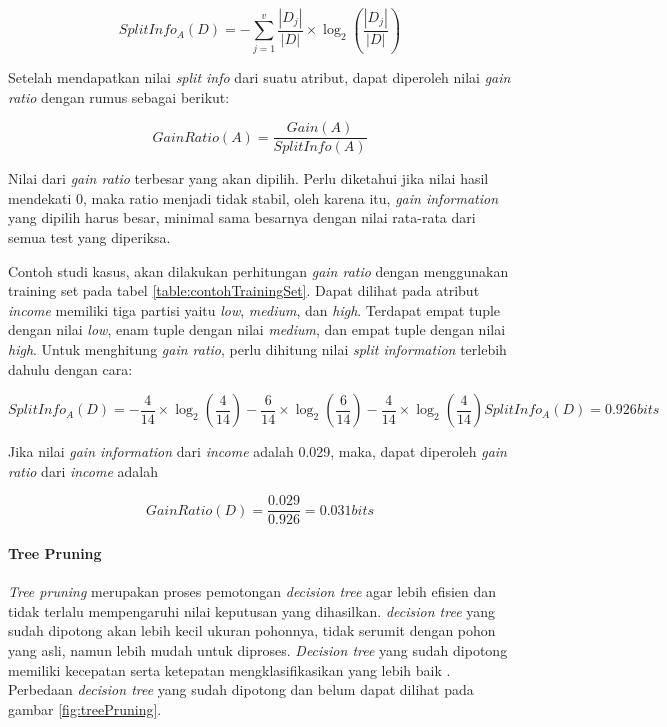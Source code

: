 \begin{displaymath}
	SplitInfo_A(D) = - \sum_{j=1}^v \frac{|D_j|}{|D|} \times \log_2 (\frac{|D_j|}{|D|})
\end{displaymath}

Setelah mendapatkan nilai \textsl{split info} dari suatu atribut, dapat diperoleh nilai \textsl{gain ratio} dengan rumus sebagai berikut:

\begin{displaymath}
	GainRatio(A) = \frac{Gain(A)}{SplitInfo(A)}
\end{displaymath}

Nilai dari \textsl{gain ratio} terbesar yang akan dipilih. Perlu diketahui \cite{DM} jika nilai hasil mendekati 0, maka ratio menjadi tidak stabil, oleh karena itu, \textsl{gain information} yang dipilih harus besar, minimal sama besarnya dengan nilai rata-rata dari semua test yang diperiksa.

Contoh studi kasus, akan dilakukan perhitungan \textsl{gain ratio} dengan menggunakan training set pada tabel \ref{table:contohTrainingSet}. Dapat dilihat pada atribut \textsl{income} memiliki tiga partisi yaitu \textsl{low}, \textsl{medium}, dan \textsl{high}. Terdapat empat tuple dengan nilai \textsl{low}, enam tuple dengan nilai \textsl{medium}, dan empat tuple dengan nilai \textsl{high}. Untuk menghitung \textsl{gain ratio}, perlu dihitung nilai \textsl{split information} terlebih dahulu dengan cara:

\begin{displaymath}
	SplitInfo_A(D) = - \frac{4}{14} \times \log_2 (\frac{4}{14}) - \frac{6}{14} \times \log_2 (\frac{6}{14}) - \frac{4}{14} \times \log_2 (\frac{4}{14})
	SplitInfo_A(D) = 0.926 bits
\end{displaymath} 

Jika nilai \textsl{gain information} dari \textsl{income} adalah 0.029, maka, dapat diperoleh \textsl{gain ratio} dari \textsl{income} adalah

\begin{displaymath}
	GainRatio(D) = \frac{0.029}{0.926} = 0.031 bits
\end{displaymath}

\paragraph{Tree Pruning}
	
\textsl{Tree pruning} merupakan proses pemotongan \textsl{decision tree} agar lebih efisien dan tidak terlalu mempengaruhi nilai keputusan yang dihasilkan. \textsl{decision tree} yang sudah dipotong akan lebih kecil ukuran pohonnya, tidak serumit dengan pohon yang asli, namun lebih mudah untuk diproses. \textsl{Decision tree} yang sudah dipotong memiliki kecepatan serta ketepatan mengklasifikasikan yang lebih baik \cite{DM}. Perbedaan \textsl{decision tree} yang sudah dipotong dan belum dapat dilihat pada gambar \ref{fig:treePruning}.

